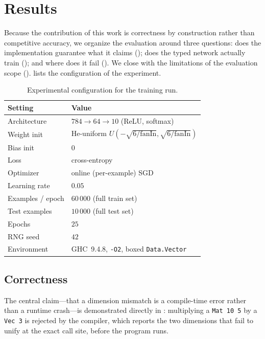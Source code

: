 \documentclass[sigconf,nonacm]{acmart}
\begin{document}
\section{Results}
\label{sec:results}

Because the contribution of this work is correctness by construction rather than
competitive accuracy, we organize the evaluation around three questions: does the
implementation guarantee what it claims (); does the typed
network actually train (); and where does it fail
(). We close with the limitations of the evaluation scope
().  lists the configuration of the
experiment.

\begin{table}[t]
  \centering
  \caption{Experimental configuration for the training run.}
  \label{tab:setup}
  \begin{tabular}{ll}
    \toprule
    Setting & Value \\
    \midrule
    Architecture       & $784 \to 64 \to 10$ (ReLU, softmax) \\
    Weight init        & He-uniform $U(-\sqrt{6/\mathrm{fanIn}}, \sqrt{6/\mathrm{fanIn}})$ \\
    Bias init          & $0$ \\
    Loss               & cross-entropy \\
    Optimizer          & online (per-example) SGD \\
    Learning rate      & $0.05$ \\
    Examples / epoch   & $60\,000$ (full train set) \\
    Test examples      & $10\,000$ (full test set) \\
    Epochs             & $25$ \\
    RNG seed           & $42$ \\
    Environment        & GHC~9.4.8, \texttt{-O2}, boxed \texttt{Data.Vector} \\
    \bottomrule
  \end{tabular}
\end{table}

\subsection{Correctness}
\label{sec:res:correct}

The central claim---that a dimension mismatch is a compile-time error rather than
a runtime crash---is demonstrated directly in : multiplying a
\texttt{Mat 10 5} by a \texttt{Vec 3} is rejected by the compiler, which reports
the two dimensions that fail to unify at the exact call site, before the program
runs.
\end{document}
